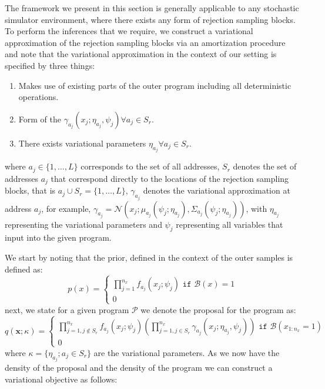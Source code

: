 \documentclass{article}
\begin{document}
The framework we present in this section is generally applicable to any stochastic simulator 
environment, where there exists any form of rejection sampling blocks.
To perform the inferences that we require, we construct a variational approximation of the rejection sampling 
blocks via an amortization procedure
and note that the variational approximation in the context of our setting is specified by three things:
\begin{enumerate}
  \itemsep0em 
  \item Makes use of existing parts of the outer program including all deterministic operations.
  \item Form of the $\gamma_{a_j}(x_j ; \eta_{a_j}, \psi_j) \forall a_j \in S_r$. 
  \item There exists variational parameters $\eta_{a_j} \forall a_j \in S_r$.
\end{enumerate}
where $a_j \in \{1, \ldots, L\}$ corresponds to the set of all addresses, $S_r$ denotes the set of addresses $a_j$ that correspond directly to the locations 
of the rejection sampling blocks, that is $a_j \cup S_r = \{1, \ldots, L\}$, $\gamma_{a_j}$ denotes the variational approximation at address $a_j$, 
for example, $\gamma_{a_j} = \mathcal{N}(x_j ; \mu_{a_j}(\psi_j; \eta_{a_j}), \Sigma_{a_j}(\psi_j ; \eta_{a_j}))$, with $\eta_{a_j}$ representing the variational
parameters and $\psi_j$ representing all variables that input into the given program. 

We start by noting that the prior, defined in the context of the outer samples is defined as: 
\begin{equation}
  p(x) = 
  \begin{cases}
    \prod^{n_{x}}_{j=1} f_{a_j}(x_j ; \psi_j) \texttt{ if } \mathcal{B}(x) = 1 \\
    0
  \end{cases}
\end{equation}
next, we state for a given program $\mathcal{P}$ we denote the proposal for the program as:
\begin{equation}
  q(\mathbf{x}; \kappa) = 
  \begin{cases}
  \prod^{n_x}_{j=1, j\notin S_{r}} f_{a_j}(x_j ; \psi_j)(\prod^{n_x}_{j=1, j \in S_{r}} \gamma_{a_j}(x_j; \eta_{a_j}, \psi_{j})) \texttt{ if } \mathcal{B}(x_{1:n_{x}} = 1)\\
  0
  \end{cases}
\end{equation}
where $\kappa = \{\eta_{a_j} ; a_j \in S_{r}\}$ are the variational parameters.
As we now have the density of the proposal and the density of the program we can construct a variational objective as follows:
\end{document}

